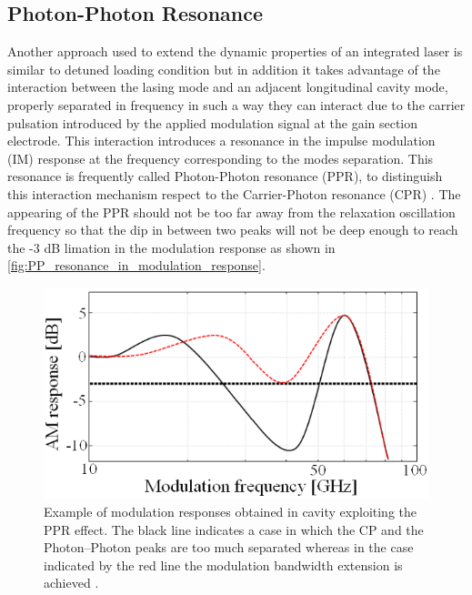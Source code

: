 \subsection{Photon-Photon Resonance}\label{subsec:pp_resonance}
Another approach used to extend the dynamic properties of an integrated laser is similar to detuned loading condition but in addition it takes advantage of the interaction between the lasing mode and an adjacent longitudinal cavity mode, properly separated in frequency in such a way they can interact due to the carrier pulsation introduced by the applied modulation signal at the gain section electrode. This interaction introduces a resonance in the impulse modulation (IM) response at the frequency corresponding to the modes separation. This resonance is frequently called Photon-Photon resonance (PPR), to distinguish this interaction mechanism respect to the Carrier-Photon resonance (CPR) \cite{montrosset2014laser}. The appearing of the PPR should not be too far away from the relaxation oscillation frequency so that the dip in between two peaks will not be deep enough to reach the -3 dB limation in the modulation response as shown in \autoref{fig:PP_resonance_in_modulation_response}.
\begin{figure}[ht]
    \centering
    \includegraphics[width=.6\linewidth]{figures/PP_resonance_in_modulation_response.png}
    \caption{Example of modulation responses obtained in cavity exploiting the PPR effect. The black line indicates a case in which the CP and the Photon–Photon peaks are too much separated whereas in the case indicated by the red line the modulation bandwidth extension is achieved \cite{montrosset2014laser}.}
    \label{fig:PP_resonance_in_modulation_response}
\end{figure}

